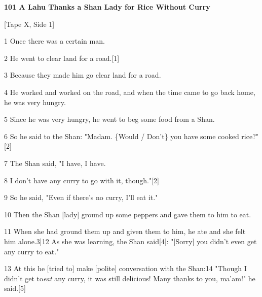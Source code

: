 
\textbf{101 A Lahu Thanks a Shan Lady for Rice Without Curry }

[Tape X, Side 1]

1 Once there was a certain man.

2 He went to clear land for a road.[1]

3 Because they made him go clear land for a road.

4 He worked and worked on the road, and when the time came to go back home, he
was very hungry.

5 Since he was very hungry, he went to beg some food from a Shan.

6 So he said to the Shan: "Madam. \{Would / Don't\} you have some cooked
rice?"[2]

7 The Shan said, "I have, I have.

8 I don't have any curry to go with it, though."[2]

9 So he said, "Even if there's no curry, I'll eat it."

10 Then the Shan [lady] ground up some peppers and gave them to him to eat.

11 When she had ground them up and given them to him, he ate and she felt him alone.3]12
As she was learning, the Shan said[4]: "[Sorry] you didn't even get any
curry to eat."

13 At this he [tried to] make [polite] conversation with the Shan:14 "Though
I didn't get to\textit{eat} any curry, it was still delicious! Many thanks to you,
ma'am!" he said.[5]

